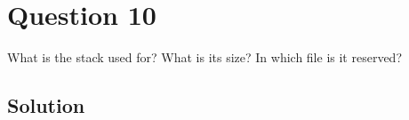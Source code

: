 \section*{Question 10}

What is the stack used for?
What is its size?
In which file is it reserved?

\subsection*{Solution}

